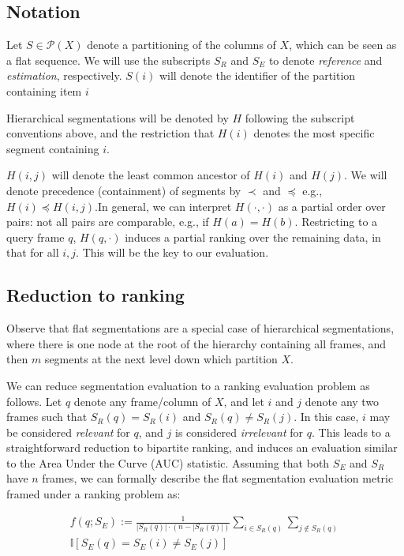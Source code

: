 \documentclass{article}
\begin{document}
\subsection{Notation}

Let $S \in \mathcal{P}(X)$ denote a partitioning of the columns of $X$, which can be seen as a flat sequence.
We will use the subscripts $S_R$ and $S_E$ to denote \emph{reference} and \emph{estimation}, respectively.
$S(i)$ will denote the identifier of the partition containing item $i$

Hierarchical segmentations will be denoted by $H$ following the subscript conventions above, and the restriction that $H(i)$ denotes the most specific segment containing $i$.

$H(i, j)$ will denote the least common ancestor of $H(i)$ and $H(j)$.
We will denote precedence (containment) of segments by $\prec$ and $\preceq$ e.g., $H(i) \preceq H(i, j)$.In general, we can interpret $H(\cdot, \cdot)$ as a partial order over pairs: not all pairs are comparable, e.g., if $H(a) = H(b)$.
Restricting to a query frame $q$, $H(q, \cdot)$ induces a partial ranking over the remaining data, in that for all $i, j$.
This will be the key to our evaluation.


\subsection{Reduction to ranking}

Observe that flat segmentations are a special case of hierarchical segmentations, where there is one node at the root of the hierarchy containing all frames, and then $m$ segments at the next level down which partition $X$.

We can reduce segmentation evaluation to a ranking evaluation problem as follows.
Let $q$ denote any frame/column of $X$, and let $i$ and $j$ denote any two frames such that $S_R(q) = S_R(i)$ and $S_R(q) \neq S_R(j)$.
In this case, $i$ may be considered \emph{relevant} for $q$, and $j$ is considered \emph{irrelevant} for $q$.
This leads to a straightforward reduction to bipartite ranking, and induces an evaluation similar to the Area Under the Curve (AUC) statistic. 
Assuming that both $S_E$ and $S_R$ have $n$ frames, we can formally describe the flat segmentation evaluation metric framed under a ranking problem as:

\begin{multline}
f(q ; S_E) := \frac{1}{|S_R(q)|\cdot (n - |S_R(q)|)} \sum_{i \in S_R(q)} \sum_{j \notin S_R(q)} \\ \mathbb{I}\left[ S_E(q) = S_E(i) \neq S_E(j) \right]
\end{multline}
\end{document}
